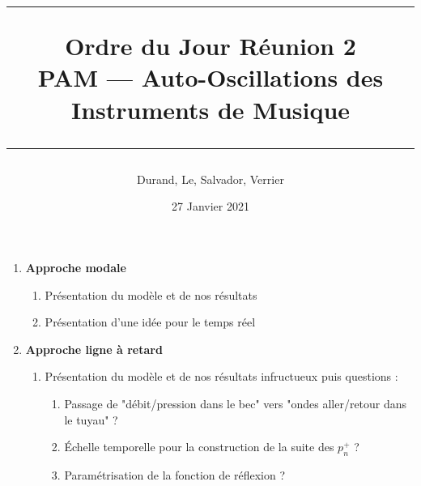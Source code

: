 \documentclass[a4paper, 11pt]{article}
\title{
	\noindent\rule{\linewidth}{0.4pt}
	\huge{Ordre du Jour Réunion 2\\}
	\medskip
	\Large{PAM --- Auto-Oscillations des Instruments de Musique}
	\noindent\rule{\linewidth}{1pt}
}
\author{Durand, Le, Salvador, Verrier}
\date{27 Janvier 2021}
\begin{document}
\maketitle


\begin{enumerate}
	\item \textbf{Approche modale}
		\begin{enumerate}
			\item Présentation du modèle et de nos résultats
			\item Présentation d'une idée pour le temps réel
		\end{enumerate}
	\item \textbf{Approche ligne à retard}
		 \begin{enumerate}
			\item Présentation du modèle et de nos résultats infructueux puis questions :
			\begin{enumerate}
				\item Passage de "débit/pression dans le bec" vers "ondes aller/retour dans le tuyau" ?
				\item Échelle temporelle pour la construction de la suite des $p_n^{+}$ ?
				\item Paramétrisation de la fonction de réflexion ?
			\end{enumerate}
		\end{enumerate}

\end{enumerate}
\end{document}
